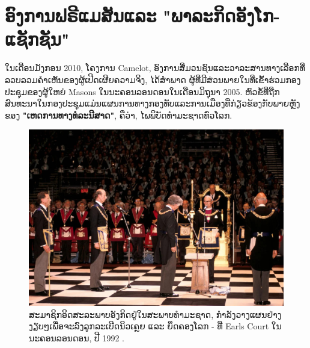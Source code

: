 \documentclass[10pt,twocolumn,letterpaper]{article}
\begin{document}
\section{ອົງການຟຣີແມສັນແລະ "ພາລະກິດອັງໂກ-ແຊັກຊັນ"}
ໃນເດືອນມັງກອນ 2010, ໂຄງການ Camelot, ອົງການສື່ມວນຊົນແລະວາລະສານທາງເລືອກທີ່ລວບລວມຄຳເຫັນຂອງຜູ້ເປີດເຜີຍຄວາມຈິງ, ໄດ້ສໍາພາດ \cite{4,6} ຜູ້ທີ່ມີສ່ວນພາຍໃນທີ່ເຂົ້າຮ່ວມກອງປະຊຸມຂອງຜູ້ໃຫຍ່ Masons ໃນນະຄອນລອນດອນໃນເດືອນມິຖຸນາ 2005. ຫົວຂໍ້ທີ່ຖືກສົນທະນາໃນກອງປະຊຸມແມ່ນແຜນການທາງກອງທັບແລະການເມືອງທີ່ກ່ຽວຂ້ອງກັບພາຍຫຼັງຂອງ \textbf{"ເຫດການທາງທໍລະນີສາດ"}, ຄືວ່າ, ໄພພິບັດທໍາມະຊາດທົ່ວໂລກ.

\begin{figure}[b]
\begin{center}
   \includegraphics[width=1\linewidth]{freemason.jpg}
\end{center}
   \caption{ສະມາຊິກອິດສະລະພາບອັງກິດຢູ່ໃນສະພາບທຳມະຊາດ, ກຳລັງວາງແຜນຢ່າງງຽບໆເພື່ອຈະລົງລູກລະເບີດນິວເຄຼຍ ແລະ ຍຶດຄອງໂລກ - ທີ່ Earls Court ໃນນະຄອນລອນດອນ, ປີ 1992 \cite{5}.}
\label{fig:1}
\label{fig:onecol}
\end{figure}
\end{document}
